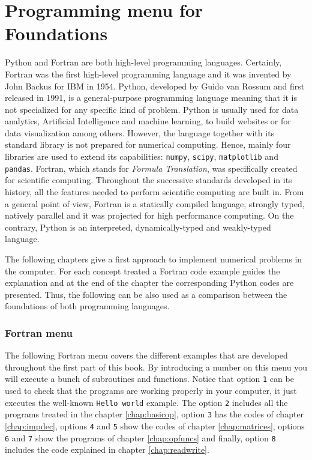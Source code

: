 
\chapter*{Programming menu for Foundations}
\vspace{-2.5cm}
Python and Fortran are both high-level programming languages. 
Certainly, Fortran was the first high-level programming language and it was invented by John Backus for IBM in 1954.
Python, developed by Guido van Rossum and first released in 1991, is a general-purpose programming language
meaning that it is not specialized for any specific kind of problem.
Python is usually used for data analytics, Artificial Intelligence and machine learning, to build websites or for data visualization among others. 
However, the language together with its standard library is not prepared for numerical computing.
Hence, mainly four libraries are used to extend its capabilities: \texttt{numpy}, \texttt{scipy}, \texttt{matplotlib} and \texttt{pandas}. 
Fortran, which stands for \textit{Formula Translation}, was specifically created for scientific computing.
Throughout the successive standards developed in its history, all the features needed to perform scientific computing are built in. 
From a general point of view, Fortran is a statically compiled language, strongly typed, natively parallel and it was projected for high performance computing.
On the contrary, Python is an interpreted, dynamically-typed and weakly-typed language.

The following chapters give a first approach to implement numerical 
problems in the computer.
For each concept treated a Fortran code example guides the explanation and at the 
end of the chapter the corresponding Python codes are presented. Thus, the following
can be also used as a comparison between the foundations of both programming languages.  


    \vspace{-0.3cm}
    \subsection*{Fortran menu}
    \vspace{-0.3cm}
The following Fortran menu covers the different examples that are developed throughout the first part of this book.
By introducing a number on this menu you will execute a bunch of subroutines and functions. 
Notice that option \texttt{1} can be used to check that the programs are working properly in your computer, it just executes the well-known \texttt{Hello world} example. 
The option \texttt{2} includes all the programs treated in the chapter \ref{chap:basicop}, 
option \texttt{3} has the codes of chapter \ref{chap:impdec},
options \texttt{4} and \texttt{5} show the codes of chapter \ref{chap:matrices},
options \texttt{6} and \texttt{7} show the programs of chapter \ref{chap:opfuncs} and finally,
option \texttt{8} includes the code explained in chapter \ref{chap:readwrite}.

